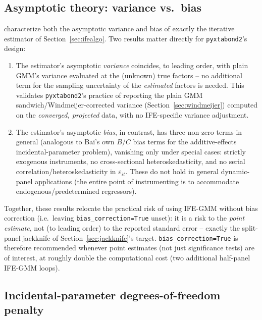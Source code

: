 \documentclass[11pt,a4paper]{article}
\newcommand{\pkg}{\texttt{pyxtabond2}}
\begin{document}
\subsection{Asymptotic theory: variance vs.\ bias}
\label{sec:asymptotics}

\citet[Theorem 3.4]{HongSuJiang2022} characterize both the asymptotic
variance and bias of exactly the iterative estimator of
Section~\ref{sec:ifealgo}. Two results matter directly for \pkg{}'s design:

\begin{enumerate}[nosep]
  \item The estimator's asymptotic \emph{variance} coincides, to leading
    order, with plain GMM's variance evaluated at the (unknown) true
    factors -- no additional term for the sampling uncertainty of the
    \emph{estimated} factors is needed. This validates \pkg{}'s practice of
    reporting the plain GMM sandwich/Windmeijer-corrected variance
    (Section~\ref{sec:windmeijer}) computed on the \emph{converged,
    projected} data, with no IFE-specific variance adjustment.
  \item The estimator's asymptotic \emph{bias}, in contrast, has three
    non-zero terms in general (analogous to Bai's own $B$/$C$ bias terms for
    the additive-effects incidental-parameter problem), vanishing only under
    special cases: strictly exogenous instruments, no cross-sectional
    heteroskedasticity, and no serial correlation/heteroskedasticity in
    $\varepsilon_{it}$. These do not hold in general dynamic-panel
    applications (the entire point of instrumenting is to accommodate
    endogenous/predetermined regressors).
\end{enumerate}
Together, these results relocate the practical risk of using IFE-GMM without
bias correction (i.e.\ leaving \texttt{bias\_correction=True} unset): it is a risk to the
\emph{point estimate}, not (to leading order) to the reported standard
error -- exactly the split-panel jackknife of Section~\ref{sec:jackknife}'s
target. \texttt{bias\_correction=True} is therefore recommended whenever
point estimates (not just significance tests) are of interest, at roughly
double the computational cost (two additional half-panel IFE-GMM loops).

\subsection{Incidental-parameter degrees-of-freedom penalty}
\label{sec:dfpca}
\end{document}

